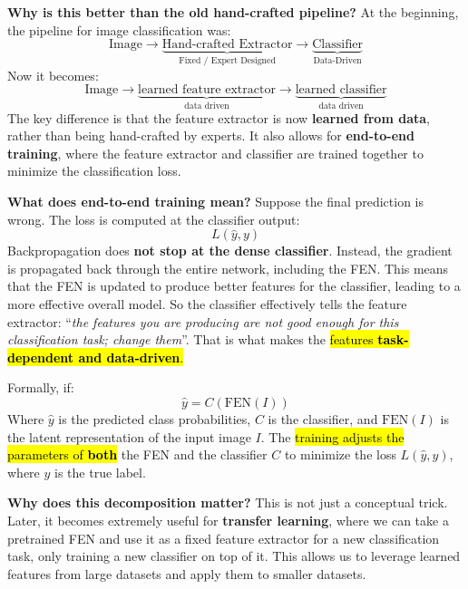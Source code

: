 \highspace
\textcolor{Green3}{ \textbf{Why is this better than the old hand-crafted pipeline?}} At the beginning, the pipeline for image classification was:
\begin{equation*}
    \text{Image} \longrightarrow \underbrace{\text{Hand-crafted Extractor}}_{\text{Fixed / Expert Designed}} \longrightarrow \underbrace{\text{Classifier}}_{\text{Data-Driven}}
\end{equation*}
Now it becomes:
\begin{equation*}
    \text{Image} \longrightarrow \underbrace{\text{learned feature extractor}}_{\text{data driven}} \longrightarrow \underbrace{\text{learned classifier}}_{\text{data driven}}
\end{equation*}
The key difference is that the feature extractor is now \textbf{learned from data}, rather than being hand-crafted by experts. It also allows for \textbf{end-to-end training}, where the feature extractor and classifier are trained together to minimize the classification loss.

\highspace
\textcolor{Green3}{ \textbf{What does end-to-end training mean?}} Suppose the final prediction is wrong. The loss is computed at the classifier output:
\begin{equation*}
    L\left(\hat{y}, y\right)
\end{equation*}
Backpropagation does \textbf{not stop at the dense classifier}. Instead, the gradient is propagated back through the entire network, including the FEN. This means that the FEN is updated to produce better features for the classifier, leading to a more effective overall model. So the classifier effectively tells the feature extractor: ``\emph{the features you are producing are not good enough for this classification task; change them}''. That is what makes the \hl{features \textbf{task-dependent and data-driven}.}

\highspace
Formally, if:
\begin{equation*}
    \hat{y} = C\left(\mathrm{FEN}(I)\right)
\end{equation*}
Where $\hat{y}$ is the predicted class probabilities, $C$ is the classifier, and $\mathrm{FEN}(I)$ is the latent representation of the input image $I$. The \hl{training adjusts the parameters of \textbf{both}} the FEN and the classifier $C$ to minimize the loss $L(\hat{y}, y)$, where $y$ is the true label.

\highspace
\textcolor{Green3}{ \textbf{Why does this decomposition matter?}} This is not just a conceptual trick. Later, it becomes extremely useful for \textbf{transfer learning}, where we can take a pretrained FEN and use it as a fixed feature extractor for a new classification task, only training a new classifier on top of it. This allows us to leverage learned features from large datasets and apply them to smaller datasets.


